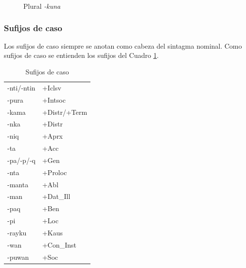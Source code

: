 \documentclass[a4paper,11pt,DIV12]{scrartcl}
\begin{document}
\begin{figure}
 \begin{center}
\end{center}
\caption{Plural {\em -kuna}}\label{Fig:kuna}
\end{figure}



  \subsubsection{Sufijos de caso}\label{Sec:caso}
Los sufijos de caso siempre se anotan como cabeza del sintagma nominal. Como sufijos de caso se entienden los sufijos del Cuadro \ref{Tab:Caso}.

\begin{table}
\caption{Sufijos de caso}\label{Tab:Caso}
\begin{center}
\begin{tabular}{ll}
\toprule
-nti/-ntin & +Iclsv\\
-pura & +Intsoc\\
-kama & +Distr/+Term\\
-nka & +Distr\\
-niq & +Aprx\\
-ta & +Acc\\
-pa/-p/-q & +Gen\\
-nta & +Proloc\\
-manta & +Abl\\
-man & +Dat\_Ill\\
-paq & +Ben\\
-pi & +Loc\\
-rayku &  +Kaus\\
-wan & +Con\_Inst\\ 
-puwan & +Soc\\
\bottomrule
\end{tabular}
\end{center}
\end{table}
\end{document}

